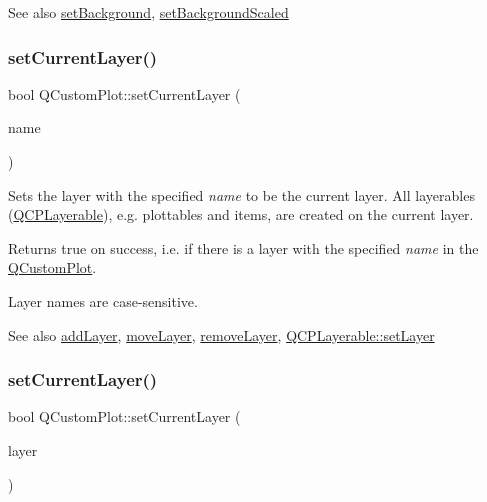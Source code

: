 \begin{DoxySeeAlso}{See also}
\hyperlink{class_q_custom_plot_a130358592cfca353ff3cf5571b49fb00}{set\+Background}, \hyperlink{class_q_custom_plot_a36f0fa1317325dc7b7efea615ee2de1f}{set\+Background\+Scaled} 
\end{DoxySeeAlso}
\hypertarget{class_q_custom_plot_a73a6dc47c653bb6f8f030abca5a11852}{}\label{class_q_custom_plot_a73a6dc47c653bb6f8f030abca5a11852} 
\subsubsection{\texorpdfstring{set\+Current\+Layer()}{setCurrentLayer()}\hspace{0.1cm}{\footnotesize\ttfamily [1/2]}}
{\footnotesize\ttfamily bool Q\+Custom\+Plot\+::set\+Current\+Layer (\begin{DoxyParamCaption}\item[{const Q\+String \&}]{name }\end{DoxyParamCaption})}

Sets the layer with the specified {\itshape name} to be the current layer. All layerables (\hyperlink{class_q_c_p_layerable}{Q\+C\+P\+Layerable}), e.\+g. plottables and items, are created on the current layer.

Returns true on success, i.\+e. if there is a layer with the specified {\itshape name} in the \hyperlink{class_q_custom_plot}{Q\+Custom\+Plot}.

Layer names are case-\/sensitive.

\begin{DoxySeeAlso}{See also}
\hyperlink{class_q_custom_plot_ad5255393df078448bb6ac83fa5db5f52}{add\+Layer}, \hyperlink{class_q_custom_plot_ae896140beff19424e9e9e02d6e331104}{move\+Layer}, \hyperlink{class_q_custom_plot_a40f75e342c5eaab6a86066a42a0e2a94}{remove\+Layer}, \hyperlink{class_q_c_p_layerable_ab0d0da6d2de45a118886d2c8e16d5a54}{Q\+C\+P\+Layerable\+::set\+Layer} 
\end{DoxySeeAlso}
\hypertarget{class_q_custom_plot_a23a4d3cadad1a0063c5fe19aac5659e6}{}\label{class_q_custom_plot_a23a4d3cadad1a0063c5fe19aac5659e6} 
\subsubsection{\texorpdfstring{set\+Current\+Layer()}{setCurrentLayer()}\hspace{0.1cm}{\footnotesize\ttfamily [2/2]}}
{\footnotesize\ttfamily bool Q\+Custom\+Plot\+::set\+Current\+Layer (\begin{DoxyParamCaption}\item[{\hyperlink{class_q_c_p_layer}{Q\+C\+P\+Layer} $\ast$}]{layer }\end{DoxyParamCaption})}

